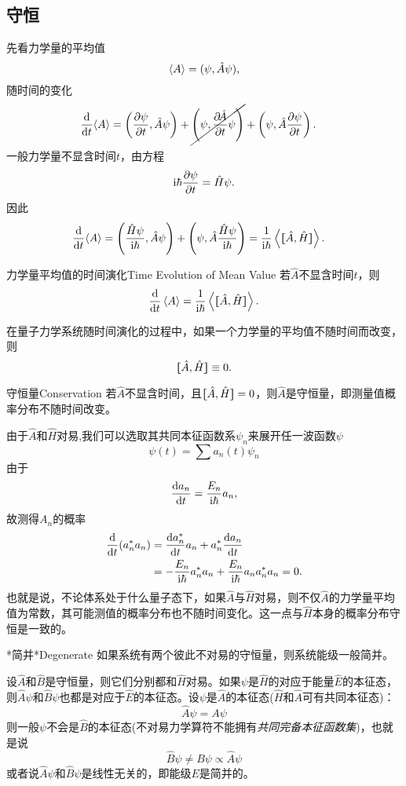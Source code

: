 \subsection{守恒}
先看力学量的平均值
\[
	\left\langle A\right\rangle=(\psi,\hat A\psi),
\]
随时间的变化
\begin{align*}
	\dd t{\ave A} & =\kh{\pv\psi{t},\hat A\psi}+\cancel{\kh{\psi,\pv{\!\hat A}t\psi}}+\kh{\psi,\hat A\pv{\psi}t}.
\end{align*}
一般力学量不显含时间$t$，由\Schr 方程
\[
	\mathrm{i}\hbar\frac{\partial^{\;\!\!}\psi}{\partial t^{\;\!\!}}=\hat H\psi.
\]
因此
\begin{align*}
	\dd t{\ave A} & =\kh{\frac{\hat H\psi}{\i\hbar},\hat A\psi}+\kh{\psi,\hat A\frac{\hat H\psi}{\i\hbar}}
	=\frac1{\i\hbar}\ave{\cmm AH}. %
\end{align*}
\begin{theorem}{力学量平均值的时间演化}{Time Evolution of Mean Value}
	若$\hat A$不显含时间$t$，则
	\begin{align}
		\dd t\ave A=\frac1{\i\hbar}\ave{\cmm AH}.
	\end{align}
\end{theorem}
在量子力学系统随时间演化的过程中，如果一个力学量的平均值不随时间而改变，则
\[
	\lfloor\hspace{-4.7 pt}\lceil \hat A,\hat H\rceil\hspace{-4.7 pt}\rfloor\equiv 0.
\]
\begin{theorem}{守恒量}{Conservation}
	若$\hat A$不显含时间，且$\lfloor\hspace{-4.7 pt}\lceil \hat A,\hat H\rceil\hspace{-4.7 pt}\rfloor=0$，则$\hat A$是守恒量，即测量值概率分布不随时间改变。
\end{theorem}
由于$\hat A$和$\hat H$对易,我们可以选取其共同本征函数系$\psi_n$来展开任一波函数$\psi$
\[
	\psi(t)=\sum a_n(t)\psi_n
\]
由于
\[
	\frac{\mathrm{d}^{\;\!\!}a_n}{\mathrm{d} t^{\;\!\!}}=\frac{E_n}{\mathrm{i}\hbar}a_n,
\]
故测得$A_n$的概率
\begin{align*}
	\dd t(a_n^*a_n) & =\dv{a_n\cj}ta_n+a_n\cj\dv{a_n}t                                    \\
	                & =-\frac{E_n}{\i\hbar}a_n\cj a_n+\frac{E_n}{\i\hbar}a_na_n\cj a_n=0.
\end{align*}
也就是说，不论体系处于什么量子态下，如果$\hat A$与$\hat H$对易，则不仅$\hat A$的力学量平均值为常数，其可能测值的概率分布也不随时间变化。这一点与$\hat H$本身的概率分布守恒是一致的。

\begin{theorem}{*简并}{*Degenerate}
	如果系统有两个彼此不对易的守恒量，则系统能级一般简并。
\end{theorem}
设$\hat A$和$\hat B$是守恒量，则它们分别都和$\hat H$对易。如果$\psi$是$\hat H$的对应于能量$\hat E$的本征态，则$\hat A\psi$和$\hat B\psi$也都是对应于$\hat E$的本征态。设$\psi$是$\hat A$的本征态($\hat H$和$\hat A$可有共同本征态)：
\[
	\hat A\psi=A\psi
\]
则一般$\psi$不会是$\hat B$的本征态(不对易力学算符不能拥有\textit{共同完备本征函数集})，也就是说
\[
	\hat B\psi\neq B\psi\propto\hat A\psi
\]
或者说$\hat A\psi$和$\hat B\psi$是线性无关的，即能级$E$是简并的。

